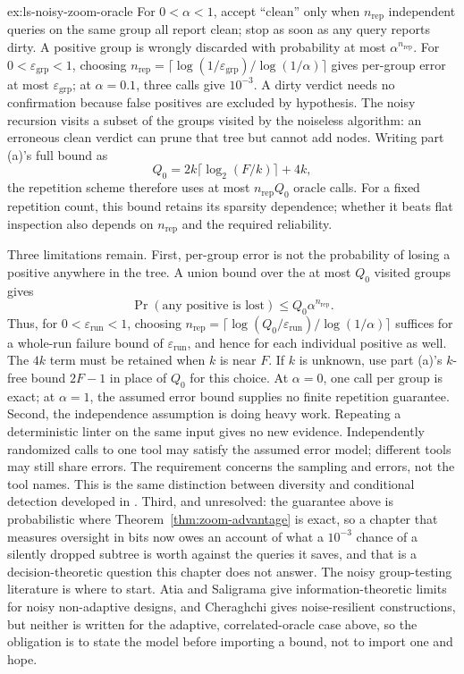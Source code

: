 \documentclass[11pt,a4paper]{article}
\theoremstyle{definition}
\theoremstyle{plain}
\begin{document}
\begin{pdsolution}{ex:ls-noisy-zoom-oracle}
For $0<\alpha<1$, accept ``clean'' only when $n_{\mathrm{rep}}$ independent queries
on the same group all report clean; stop as soon as any query reports dirty.
A positive group is wrongly discarded with probability at most $\alpha^{n_{\mathrm{rep}}}$.
For $0<\varepsilon_{\mathrm{grp}}<1$, choosing
$n_{\mathrm{rep}}=\lceil\log(1/\varepsilon_{\mathrm{grp}})/\log(1/\alpha)\rceil$ gives per-group error at most
$\varepsilon_{\mathrm{grp}}$; at $\alpha=0.1$, three calls give $10^{-3}$. A dirty verdict needs
no confirmation because false positives are excluded by hypothesis.
The noisy recursion visits a subset of the groups visited by the noiseless
algorithm: an erroneous clean verdict can prune that tree but cannot add nodes.
Writing part (a)'s full bound as
\[
Q_0=2k\lceil\log_2(F/k)\rceil+4k,
\]
the repetition scheme therefore uses at most $n_{\mathrm{rep}}Q_0$ oracle calls. For a fixed
repetition count, this bound retains its sparsity dependence; whether it beats
flat inspection also depends on $n_{\mathrm{rep}}$ and the required reliability.

Three limitations remain. First, per-group error is not the probability of
losing a positive anywhere in the tree. A union bound over the at most $Q_0$
visited groups gives
\[
\Pr(\text{any positive is lost})\le Q_0\alpha^{n_{\mathrm{rep}}}.
\]
Thus, for $0<\varepsilon_{\mathrm{run}}<1$, choosing
$n_{\mathrm{rep}}=\lceil\log(Q_0/\varepsilon_{\mathrm{run}})/\log(1/\alpha)\rceil$ suffices for a whole-run
failure bound of $\varepsilon_{\mathrm{run}}$, and hence for each individual positive as well.
The $4k$ term must be retained when $k$ is near $F$. If $k$ is unknown, use
part (a)'s $k$-free bound $2F-1$ in place of $Q_0$ for this choice.
At $\alpha=0$, one call per group is exact; at $\alpha=1$, the assumed error
bound supplies no finite repetition guarantee. Second, the
independence assumption is doing heavy work. Repeating a deterministic linter
on the same input gives no new evidence. Independently randomized calls to one
tool may satisfy the assumed error model; different tools may still share errors.
The requirement concerns the sampling and errors, not the tool names. This is
the same distinction between diversity and conditional detection developed in
. Third, and unresolved: the guarantee above is
probabilistic where Theorem~\ref{thm:zoom-advantage} is exact, so a chapter that
measures oversight in bits now owes an account of what a $10^{-3}$ chance of a
silently dropped subtree is worth against the queries it saves, and that is a
decision-theoretic question this chapter does not answer. The noisy
group-testing literature is where to start. Atia and Saligrama
 give information-theoretic limits for noisy
non-adaptive designs, and Cheraghchi  gives noise-resilient
constructions, but neither is written for the adaptive, correlated-oracle case
above, so the obligation is to state the model before importing a bound, not to
import one and hope.
\end{pdsolution}
\end{document}
